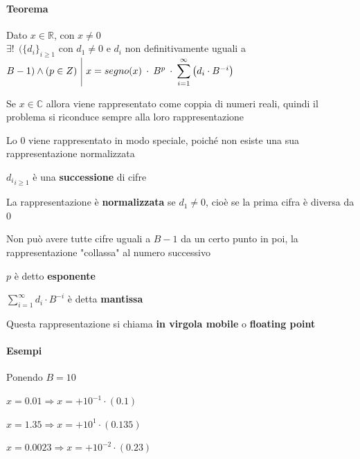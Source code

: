 \documentclass[10pt]{book}
\begin{document}
\paragraph{Teorema} Dato $x \in \mathbb{R}$, con $x \neq 0$\\$\exists!\:\:(\{d_i\}_{i \geq 1}$ con $d_1 \neq 0$ e $d_i$ non definitivamente uguali a $B - 1) \wedge (p \in Z) \:\:\vline\:\: x = segno(x)\:\cdot\:B^p\:\cdot\:\mathlarger{\sum_{i=1}^\infty}\left( d_i \cdot B^{-i}\right)$
\begin{list}{}{Considerazioni}
	\item Se $x \in \mathbb{C}$ allora viene rappresentato come coppia di numeri reali, quindi il problema si riconduce sempre alla loro rappresentazione
	\item Lo $0$ viene rappresentato in modo speciale, poiché non esiste una sua rappresentazione normalizzata
	\item ${d_i}_{i \geq 1}$ è una \textbf{successione} di cifre
	\item La rappresentazione è \textbf{normalizzata} se $d_1 \neq 0$, cioè se la prima cifra è diversa da 0
	\item Non può avere tutte cifre uguali a $B-1$ da un certo punto in poi, la rappresentazione "collassa" al numero successivo
	\item $p$ è detto \textbf{esponente}
	\item $\sum_{i=1}^\infty d_i \cdot B^{-i}$ è detta \textbf{mantissa}
	\item Questa rappresentazione si chiama \textbf{in virgola mobile} o \textbf{floating point}
\end{list}
\begin{center}
\end{center} %
\pagebreak
\paragraph{Esempi} Ponendo $B = 10$
\begin{list}{}{}
	\item $x = 0.01 \Rightarrow x = +10^{-1}\cdot(0.1)$
	\item $x = 1.35 \Rightarrow x = +10^1\cdot(0.135)$
	\item $x = 0.0023 \Rightarrow x = +10^{-2}\cdot(0.23)$
\end{list}
\end{document}

